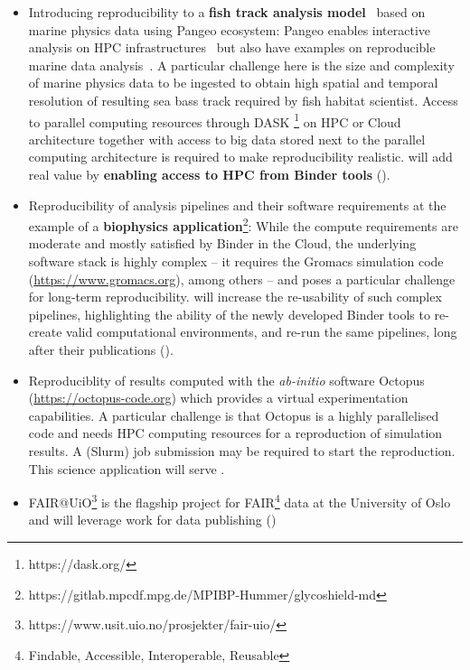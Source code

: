 \begin{itemize}
\item Introducing reproducibility to a \textbf{fish track analysis model}~\cite{woillez2016} based on
  marine physics data using Pangeo ecosystem:
  Pangeo enables interactive analysis on HPC infrastructures~\cite{odaka2020}
  but also have examples on reproducible marine data analysis~\cite{maze2020}.
  A particular challenge here is
  the size and complexity of marine physics data to be ingested
  to obtain high spatial and temporal resolution of resulting sea bass track
  required by fish habitat scientist.
  Access to parallel computing resources through DASK \footnote{https://dask.org/} on HPC or
  Cloud architecture together with access to big data stored next to the
  parallel computing architecture is required to make reproducibility realistic.
  \TheProject will add real value by \textbf{enabling access to HPC from Binder tools} ().
\item Reproducibility of analysis pipelines and their software
  requirements at the example of a
  \textbf{biophysics application}\footnote{https://gitlab.mpcdf.mpg.de/MPIBP-Hummer/glycoshield-md}:
  While the compute requirements are moderate and mostly satisfied by Binder in the Cloud,
  the underlying software stack is highly complex -- it requires the Gromacs simulation
  code (\href{https://www.gromacs.org}{https://www.gromacs.org}), among others
  -- and poses a particular challenge for long-term reproducibility.
  \TheProject will increase the re-usability of such complex pipelines,
  highlighting the ability of the newly developed Binder tools to re-create valid computational environments,
  and re-run the same pipelines, long after their publications ().
\item Reproduciblity of results computed with the \emph{ab-initio} software Octopus
  (\href{https://octopus-code.org}{https://octopus-code.org}) which provides a
  virtual experimentation capabilities. A particular challenge is that Octopus
  is a highly parallelised code and needs HPC computing resources for a
  reproduction of simulation results. A (Slurm) job submission may be required
  to start the reproduction. This science application will serve .
\item FAIR@UiO\footnote{https://www.usit.uio.no/prosjekter/fair-uio/} is the flagship project for FAIR\footnote{Findable, Accessible, Interoperable, Reusable}
  data at the University of Oslo and will leverage \TheProject work for data publishing ()

\end{itemize}
